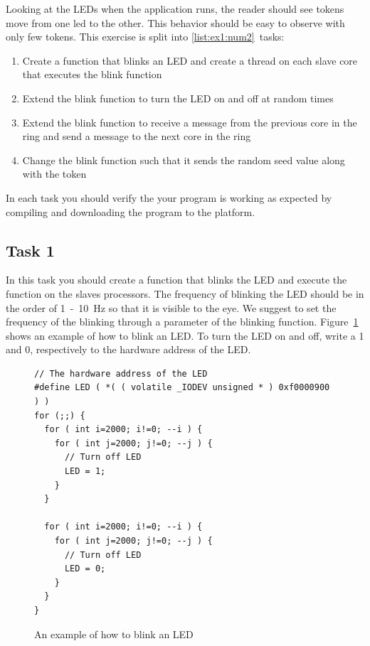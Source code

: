 \documentclass[a4paper,fontsize=10pt,twoside,DIV15,BCOR12mm,headinclude=true,footinclude=false,pagesize,bibtotoc]{scrbook}
\begin{document}
\noindent Looking at the LEDs when the application runs,
the reader should see tokens move from one led to the other.
This behavior should be easy to observe with only few tokens.
This exercise is split into \ref{list:ex1:num2}~tasks:
\begin{framed}
\begin{enumerate}
\item Create a function that blinks an LED and create a thread on each slave core that executes the blink function
\item Extend the blink function to turn the LED on and off at random times
\item Extend the blink function to receive a message from the previous core in the ring and send a message to the next core in the ring
\item Change the blink function such that it sends the random seed value along with the token
\label{list:ex1:num2}\end{enumerate}
\end{framed}

\noindent In each task you should verify the your program is working as expected by compiling and downloading the program to the platform.

\subsection{Task 1}
In this task you should create a function that blinks the LED and execute the function on the slaves processors.
The frequency of blinking the LED should be in the order of 1~-~10~Hz so that it is visible to the eye.
We suggest to set the frequency of the blinking through a parameter of the blinking function.
Figure~\ref{fig:ctrl_led} shows an example of how to blink an LED.
To turn the LED on and off, write a 1 and 0, respectively to the hardware address of the LED. 

\begin{figure}
\begin{Verbatim}[xleftmargin=1cm,xrightmargin=1cm,frame=single,framesep=3mm]
// The hardware address of the LED
#define LED ( *( ( volatile _IODEV unsigned * ) 0xf0000900 ) )
for (;;) {
  for ( int i=2000; i!=0; --i ) {
    for ( int j=2000; j!=0; --j ) {
      // Turn off LED
      LED = 1;
    }
  }

  for ( int i=2000; i!=0; --i ) {
    for ( int j=2000; j!=0; --j ) {
      // Turn off LED
      LED = 0;
    }
  }
}
\end{Verbatim}
\caption{\label{fig:ctrl_led}An example of how to blink an LED}
\end{figure}
\end{document}
